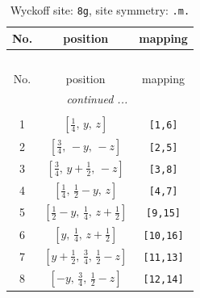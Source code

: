\documentclass[fleqn,8pt]{jsarticle}
\begin{document}
\begin{longtable}{ccc}
\caption{Wyckoff site: {\tt 8g}, site symmetry: {\tt .m.}}
 \\
 \hline \hline
No. & position & mapping \\ \hline \endfirsthead

\multicolumn{2}{l}{\tablename\ \thetable{}} \\
 \hline \hline
No. & position & mapping \\ \hline \endhead

 \hline \hline
\multicolumn{2}{r}{\footnotesize\it continued ...} \\ \endfoot

 \hline \hline
\multicolumn{2}{r}{} \\ \endlastfoot

1 & $\left[ \frac{1}{4},\, y,\, z \right]$ & {\tt [1,6]} \\ \hline
2 & $\left[ \frac{3}{4},\, - y,\, - z \right]$ & {\tt [2,5]} \\ \hline
3 & $\left[ \frac{3}{4},\, y + \frac{1}{2},\, - z \right]$ & {\tt [3,8]} \\ \hline
4 & $\left[ \frac{1}{4},\, \frac{1}{2} - y,\, z \right]$ & {\tt [4,7]} \\ \hline
5 & $\left[ \frac{1}{2} - y,\, \frac{1}{4},\, z + \frac{1}{2} \right]$ & {\tt [9,15]} \\ \hline
6 & $\left[ y,\, \frac{1}{4},\, z + \frac{1}{2} \right]$ & {\tt [10,16]} \\ \hline
7 & $\left[ y + \frac{1}{2},\, \frac{3}{4},\, \frac{1}{2} - z \right]$ & {\tt [11,13]} \\ \hline
8 & $\left[ - y,\, \frac{3}{4},\, \frac{1}{2} - z \right]$ & {\tt [12,14]} \\
\end{longtable}
\renewcommand{\arraystretch}{1.2}
\end{document}
